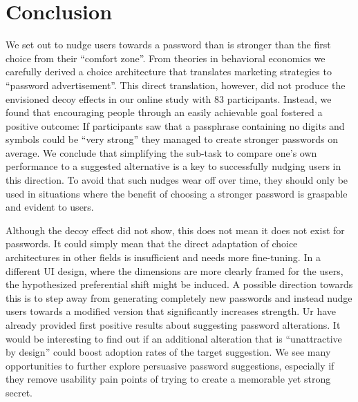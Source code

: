 \section{Conclusion}
We set out to nudge users towards a password than is stronger than the first choice from their ``comfort zone''. From theories in behavioral economics we carefully derived a choice architecture that translates marketing strategies to ``password advertisement''. This direct translation, however, did not produce the envisioned decoy effects in our online study with 83 participants. Instead, we found that encouraging people through an easily achievable goal fostered a positive outcome: If participants saw that a passphrase containing no digits and symbols could be ``very strong'' they managed to create stronger passwords on average. We conclude that simplifying the sub-task to compare one's own performance to a suggested alternative is a key to successfully nudging users in this direction. To avoid that such nudges wear off over time, they should only be used in situations where the benefit of choosing a stronger password is graspable and evident to users. 


Although the decoy effect did not show, this does not mean it does not exist for passwords. It could simply mean that the direct adaptation of choice architectures in other fields is insufficient and needs more fine-tuning. In a different UI design, where the dimensions are more clearly framed for the users, the hypothesized preferential shift might be induced. A possible direction towards this is to step away from generating completely new passwords and instead nudge users towards a modified version that significantly increases strength. Ur \etal have already provided first positive results about suggesting password alterations. It would be interesting to find out if an additional alteration that is ``unattractive by design'' could boost adoption rates of the target suggestion. We see many opportunities to further explore persuasive password suggestions, especially if they remove usability pain points of trying to create a memorable yet strong secret. 


